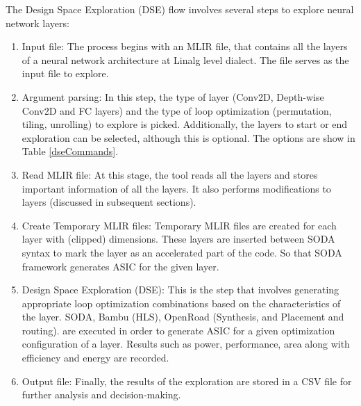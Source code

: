 The Design Space Exploration (DSE) flow involves several steps to explore neural network layers:

\begin{enumerate}
    
    \item Input file: The process begins with an MLIR file, that contains all the layers of a neural network architecture at Linalg level dialect. The file serves as the input file to explore.
    
    \item Argument parsing: In this step, the type of layer (Conv2D, Depth-wise Conv2D and FC layers) and the type of loop optimization (permutation, tiling, unrolling) to explore is picked. Additionally, the layers to start or end exploration can be selected, although this is optional. The options are show in Table \ref{dseCommands}.
    
    \item Read MLIR file: At this stage, the tool reads all the layers and stores important information of all the layers. It also performs modifications to layers (discussed in subsequent sections).
    
    \item Create Temporary MLIR files: Temporary MLIR files are created for each layer with (clipped) dimensions. These layers are inserted between SODA syntax to mark the layer as an accelerated part of the code. So that SODA framework generates ASIC for the given layer.
    
    \item Design Space Exploration (DSE): This is the step that involves generating appropriate loop optimization combinations based on the characteristics of the layer. SODA, Bambu (HLS), OpenRoad (Synthesis, and Placement and routing). are executed in order to generate ASIC for a given optimization configuration of a layer. Results such as power, performance, area along with efficiency and energy are recorded.
    
    \item Output file: Finally, the results of the exploration are stored in a CSV file for further analysis and decision-making.

\end{enumerate}


